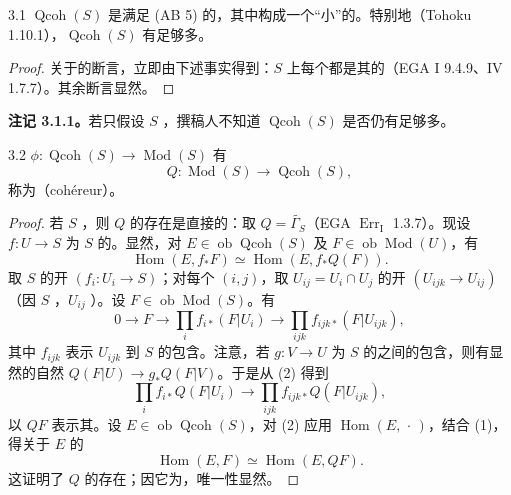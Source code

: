 \begin{SGAresult}{}{3.1}
$\operatorname{Qcoh}(S)$ 是满足 (AB 5) 的，其中构成一个“小”的。特别地（Tohoku 1.10.1），$\operatorname{Qcoh}(S)$ 有足够多。
\end{SGAresult}
\begin{proof}
关于的断言，立即由下述事实得到：$S$ 上每个都是其的（EGA I 9.4.9、IV 1.7.7）。其余断言显然。
\end{proof}
\textbf{注记 3.1.1。}若只假设 $S$ ，撰稿人不知道 $\operatorname{Qcoh}(S)$ 是否仍有足够多。
\begin{SGAresult}{}{3.2}
 $\phi:\operatorname{Qcoh}(S)\to\operatorname{Mod}(S)$ 有
\[
Q:\operatorname{Mod}(S)\longrightarrow\operatorname{Qcoh}(S),
\]
称为（cohéreur）。
\end{SGAresult}
\begin{proof}
若 $S$ ，则 $Q$ 的存在是直接的：取 $Q=\widetilde{\Gamma_S}$（EGA $\operatorname{Err}_{\mathrm I}$ 1.3.7）。现设 $f:U\to S$ 为 $S$ 的。显然，对 $E\in\operatorname{ob}\operatorname{Qcoh}(S)$ 及 $F\in\operatorname{ob}\operatorname{Mod}(U)$，有
\[
\operatorname{Hom}(E,f_*F)\simeq\operatorname{Hom}(E,f_*Q(F)).\tag{1}
\]
取 $S$ 的开 $(f_i:U_i\to S)$；对每个 $(i,j)$，取 $U_{ij}=U_i\cap U_j$ 的开 $(U_{ijk}\to U_{ij})$（因 $S$ ，$U_{ij}$ ）。设 $F\in\operatorname{ob}\operatorname{Mod}(S)$。有
\[
0\longrightarrow F\longrightarrow\prod_i f_{i*}(F|U_i)\longrightarrow\prod_{ijk}f_{ijk*}(F|U_{ijk}),\tag{2}
\]
其中 $f_{ijk}$ 表示 $U_{ijk}$ 到 $S$ 的包含。注意，若 $g:V\to U$ 为 $S$ 的之间的包含，则有显然的自然 $Q(F|U)\to g_*Q(F|V)$。于是从 (2) 得到
\[
\prod_i f_{i*}Q(F|U_i)\longrightarrow\prod_{ijk}f_{ijk*}Q(F|U_{ijk}),\tag{3}
\]
以 $QF$ 表示其。设 $E\in\operatorname{ob}\operatorname{Qcoh}(S)$，对 (2) 应用 $\operatorname{Hom}(E,\,\cdot\,)$，结合 (1)，得关于 $E$ 的
\[
\operatorname{Hom}(E,F)\simeq\operatorname{Hom}(E,QF).
\]
这证明了 $Q$ 的存在；因它为，唯一性显然。
\end{proof}
